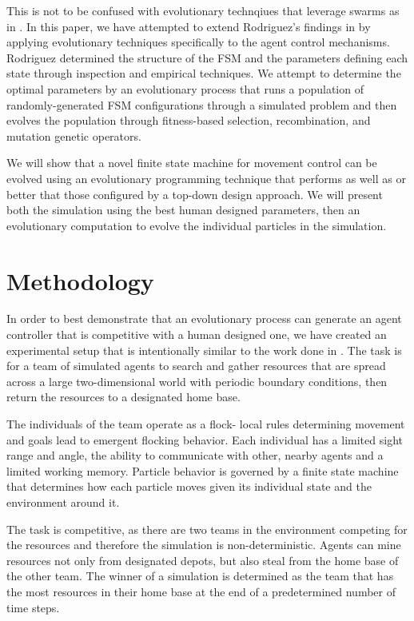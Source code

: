 \documentclass[12pt,journal,compsoc]{IEEEtran}
\begin{document}
This is not to be confused with evolutionary technqiues that leverage swarms as in \cite{wei2002swarm,miranda2005evolutionary}. In this paper, we have attempted to extend Rodriguez's findings in \cite{rodriguez2004extending} by applying evolutionary techniques specifically to the agent control mechanisms. Rodriguez determined the structure of the FSM and the parameters defining each state through inspection and empirical techniques. We attempt to determine the optimal parameters by an evolutionary process that runs a population of randomly-generated FSM configurations through a simulated problem and then evolves the population through fitness-based selection, recombination, and mutation genetic operators.

We will show that a novel finite state machine for movement control can be evolved using an evolutionary programming technique that performs as well as or better that those configured by a top-down design approach. We will present both the simulation using the best human designed parameters, then an evolutionary computation to evolve the individual particles in the simulation.

\section{Methodology}

In order to best demonstrate that an evolutionary process can generate an agent controller that is competitive with a human designed one, we have created an experimental setup that is intentionally similar to the work done in \cite{rodriguez2004extending}. The task is for a team of simulated agents to search and gather resources that are spread across a large two-dimensional world with periodic boundary conditions, then return the resources to a designated home base.

The individuals of the team operate as a flock- local rules determining movement and goals lead to emergent flocking behavior. Each individual has a limited sight range and angle, the ability to communicate with other, nearby agents and a limited working memory. Particle behavior is governed by a finite state machine that determines how each particle moves given its individual state and the environment around it.

The task is competitive, as there are two teams in the environment competing for the resources and therefore the simulation is non-deterministic. Agents can mine resources not only from designated depots, but also steal from the home base of the other team. The winner of a simulation is determined as the team that has the most resources in their home base at the end of a predetermined number of time steps.
\end{document}
